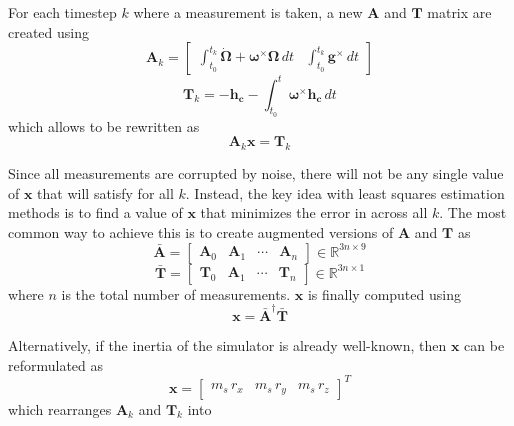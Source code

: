 For each timestep $k$ where a measurement is taken, a new $\bm{A}$ and $\bm{T}$ matrix are created using
\begin{equation}
    \bm{A}_k=\begin{bmatrix}
    \int_{t_0}^{t_k}\dot{\bm{\Omega}}+\bm{\omega}^{\times}\bm{\Omega}\,dt & \int_{t_0}^{t_k}\bm{g}^{\times}\,dt
    \end{bmatrix}
\end{equation}
\begin{equation}
    \bm{T}_k=-{\bm{h_c}} - \int_{t_0}^{t}\bm{\omega}^{\times}\bm{h_c}\,dt
\end{equation}
which allows  to be rewritten as 
\begin{equation}\label{equation:LSM_with_k}
    \bm{A}_k\bm{x}=\bm{T}_k
\end{equation}

Since all measurements are corrupted by noise, there will not be any single value of $\bm{x}$ that will satisfy  for all $k$. Instead, the key idea with least squares estimation methods is to find a value of $\bm{x}$ that minimizes the error in  across all $k$. The most common way to achieve this is to create augmented versions of $\bm{A}$ and $\bm{T}$ as
\begin{equation}\label{equation:A_bar}
    \bar{\bm{A}}=\begin{bmatrix}
        \bm{A}_0 & \bm{A}_1 & \cdots & \bm{A}_n
    \end{bmatrix}\in \mathbb{R}^{3n \times 9}
\end{equation}
\begin{equation}
    \bar{\bm{T}}=\begin{bmatrix}
        \bm{T}_0 & \bm{A}_1 & \cdots & \bm{T}_n
    \end{bmatrix}\in \mathbb{R}^{3n \times 1}
\end{equation}
where $n$ is the total number of measurements. $\bm{x}$ is finally computed using 
\begin{equation}
    \bm{x}=\bar{\bm{A}}^{\dagger}\bar{\bm{T}}
\end{equation}

Alternatively, if the inertia of the simulator is already well-known, then $\bm{x}$ can be reformulated as
\begin{equation}
    \bm{x} = \begin{bmatrix}
        m_s\,r_x & m_s\,r_y & m_s\,r_z
    \end{bmatrix}^T
\end{equation} 
which rearranges $\bm{A}_k$ and $\bm{T}_k$ into

